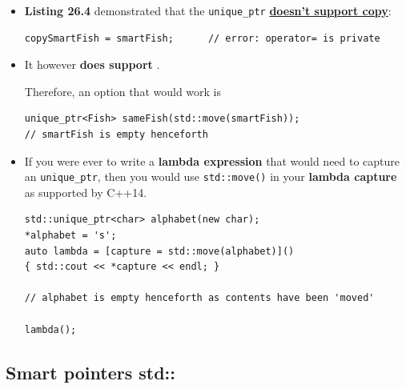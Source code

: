 \documentclass[10pt]{article}
\newcommand{\pbreak}{\vspace{30pt}}
\begin{document}
\newpage
\begin{tcolorbox}
	\begin{itemize}
		\item \textbf{Listing 26.4} demonstrated that the \verb|unique_ptr| \textbf{\underline{doesn't support copy}}:

			\begin{verbatim}
copySmartFish = smartFish;		// error: operator= is private
			\end{verbatim}

		\item It however \textbf{does support }.

			Therefore, an option that would work is

			\begin{verbatim}
unique_ptr<Fish> sameFish(std::move(smartFish));
// smartFish is empty henceforth
			\end{verbatim}

		\item If you were ever to write a \textbf{lambda expression} that would need to capture an \verb|unique_ptr|, then you would use \verb|std::move()| in your \textbf{lambda capture} as supported by C++14.

			\pbreak

			\begin{verbatim}
std::unique_ptr<char> alphabet(new char);
*alphabet = 's';
auto lambda = [capture = std::move(alphabet)]() 
{ std::cout << *capture << endl; }

// alphabet is empty henceforth as contents have been 'moved'

lambda();
			\end{verbatim}
	\end{itemize}
\end{tcolorbox}

\newpage
\subsection{Smart pointers std::}
\end{document}
